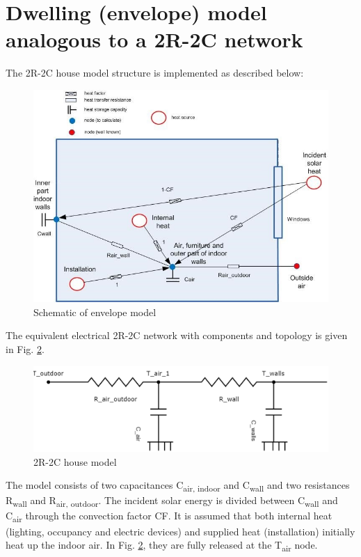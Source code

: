 \section{Dwelling (envelope) model analogous to a 2R-2C network}

The 2R-2C house model structure is implemented as described below:
	
\begin{figure}[H]
	\centering
	\includegraphics[width=1.0\columnwidth]{Pictures/envelopRC.jpg}
	\caption[Short title]{Schematic of envelope model}
	\label{fig:envelope2R2C}
	\end{figure} 
	
The equivalent electrical 2R-2C network with components and topology is given in Fig. \ref{fig:elec2R2C}.

\begin{figure}[H]
	\centering
	\includegraphics[width=1.0\columnwidth]{Pictures/2R2C_Model.png}
	\caption[Short title]{2R-2C house model}
	\label{fig:elec2R2C}
	\end{figure}
	
The model consists of two capacitances C\textsubscript{air, indoor} and C\textsubscript{wall} and two resistances R\textsubscript{wall} and R\textsubscript{air, outdoor}. The incident solar energy is divided between C\textsubscript{wall} and C\textsubscript{air} through the convection factor CF. It is assumed that both internal heat (lighting, occupancy and electric devices) and supplied heat (installation) initially heat up the indoor air. In Fig. \ref{fig:elec2R2C}, they are fully released at the T\textsubscript{air} node. 

